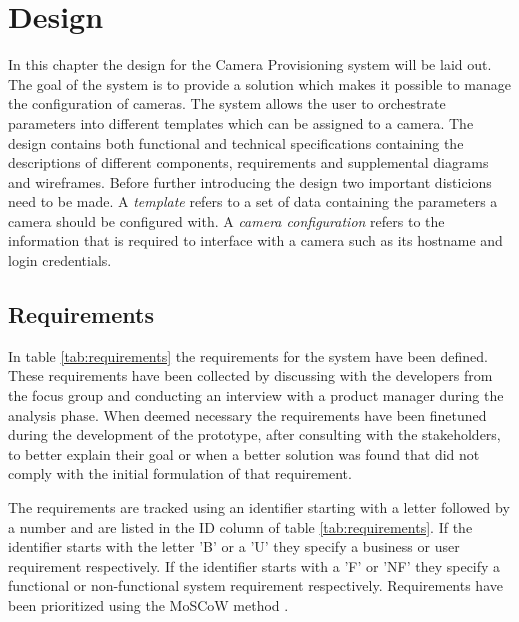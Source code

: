 \chapter{Design}
\label{sec:design}
In this chapter the design for the Camera Provisioning system will be laid out.
The goal of the system is to provide a solution which makes it possible to manage the configuration of cameras.
The system allows the user to orchestrate parameters into different templates which can be assigned to a camera.
The design contains both functional and technical specifications containing the descriptions of different components, requirements and supplemental diagrams and wireframes.
Before further introducing the design two important disticions need to be made.
A \textit{template} refers to a set of data containing the parameters a camera should be configured with.
A \textit{camera configuration} refers to the information that is required to interface with a camera such as its hostname and login credentials.

\section{Requirements}
In table \ref{tab:requirements} the requirements for the system have been defined.
These requirements have been collected by discussing with the developers from the focus group and conducting an interview with a product manager during the analysis phase.
When deemed necessary the requirements have been finetuned during the development of the prototype, after consulting with the stakeholders, to better explain their goal or when a better solution was found that did not comply with the initial formulation of that requirement.

The requirements are tracked using an identifier starting with a letter followed by a number and are listed in the ID column of table \ref{tab:requirements}.
If the identifier starts with the letter 'B' or a 'U' they specify a business or user requirement respectively.
If the identifier starts with a 'F' or 'NF' they specify a functional or non-functional system requirement respectively.
Requirements have been prioritized using the MoSCoW method \cite{noauthor_moscow_nodate}.

